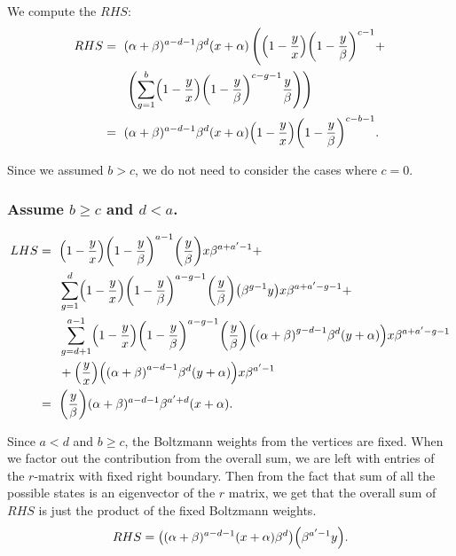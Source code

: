 \documentclass[ALCO, Unicode]{cedram}
\DeclarePairedDelimiter\autobracket{(}{)}
\newcommand{\br}[1]{\autobracket*{#1}}
\begin{document}
We compute the $RHS$:
{\allowdisplaybreaks
\begin{align*}
         RHS =\text{ }&(\alpha+\beta)^{a-d-1}\beta^{d}(x+\alpha)\left(\br{1-\dfrac{y}{x}}
                     \br{1-\dfrac{y}{\beta}}^{c-1} +\right.\\ &\left.\br{\sum^{b}_{g=1}\br{1-\dfrac{y}{x}}\br{1-\dfrac{y}{\beta}}^{c-g-1}\dfrac{y}{\beta}} \right)\\
        =\text{ }&(\alpha+\beta)^{a-d-1}\beta^{d}(x+\alpha)\br{1-\dfrac{y}{x}}\br{1-\dfrac{y}{\beta}}^{c-b-1}.
\end{align*}
}


Since we assumed $b>c$, we do not need to consider the cases where $c=0$.

\subsubsection{Assume \texorpdfstring{$b\geq c$ and $d<a$}{b>=c and d<a}.}
\label{growcase2}
{\allowdisplaybreaks
\begin{align*}
  LHS   =\text{ }& \br{1-\dfrac{y}{x}} \br{1-\dfrac {y}{\beta}}^{a-1} \br{\dfrac{y}{\beta}} x\beta^{a+a'-1}+\\
              & \sum^{d}_{g=1} \br{1-\dfrac{y}{x}} \br{1-\dfrac {y}{\beta}}^{a-g-1} \br{\dfrac{y}{\beta}} \br{\beta^{g-1}y}  x\beta^{a+a'-g-1}+\\
              &\sum^{a-1}_{g=d+1} \br{1-\dfrac{y}{x}} \br{1-\dfrac {y}{\beta}}^{a-g-1} \br{\dfrac{y}{\beta}} \br{\br{\alpha+\beta}^{g-d-1}\beta^{d}\br{y+\alpha}}  x\beta^{a+a'-g-1}\\
              &+\br{\dfrac{y}{x}}\br{\br{\alpha+\beta}^{a-d-1}\beta^{d}\br{y+\alpha}} x\beta^{a'-1}\\
    =\text{ }& \br{\dfrac{y}{\beta}}(\alpha+\beta)^{a-d-1}\beta^{a'+d}(x+\alpha).
\end{align*}
}

Since $a<d$ and $b\geq c$, the Boltzmann weights from the vertices are fixed. When we factor out the contribution from the overall sum, we are left with entries of the $r$-matrix with fixed right boundary. 
Then from the fact that sum of all the possible states is an eigenvector of the $r$ matrix, we get that the overall sum of $RHS$ is just the product of the fixed Boltzmann weights.
\[
RHS=\br{(\alpha+\beta)^{a-d-1}(x+\alpha)\beta^{d}}\br{\beta^{a'-1}y}.
\]



\end{document}

